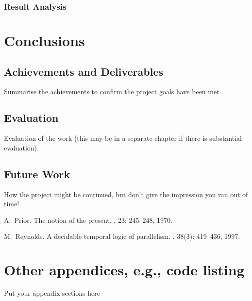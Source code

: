 \documentclass{report}
\begin{document}
\subsection{Result Analysis}


\chapter{Conclusions}
\section{Achievements and Deliverables}
Summarise the achievements to confirm the project goals have been met.
\section{Evaluation}
Evaluation of the work (this may be in a separate chapter if there is substantial evaluation).
\section{Future Work}
How the project might be continued, but don't give the impression you ran out of time!

\appendix


\begin{thebibliography}{HHM99}


A.~Prior.
\newblock The notion of the present.
, 23:  245--248, 1970.


M.~Reynolds.
\newblock A decidable temporal logic of parallelism.
, 38(3):  419--436,
  1997.
\end{thebibliography}
\chapter{Other appendices, e.g., code listing}
Put your appendix sections here
\end{document}
